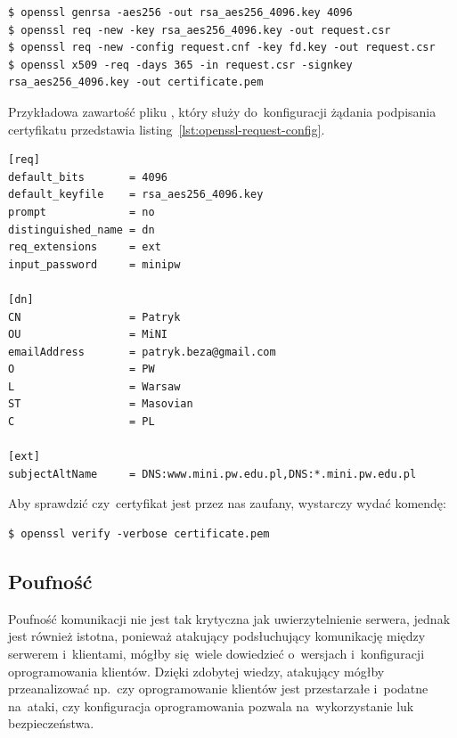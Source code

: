 \documentclass[thesis]{subfiles}
\begin{document}
\begin{lstlisting}[numbers=none,caption={Wygenerowanie i~podpisanie certyfikatu X.509},label=lst:openssl-gencert]
$ openssl genrsa -aes256 -out rsa_aes256_4096.key 4096
$ openssl req -new -key rsa_aes256_4096.key -out request.csr
$ openssl req -new -config request.cnf -key fd.key -out request.csr
$ openssl x509 -req -days 365 -in request.csr -signkey rsa_aes256_4096.key -out certificate.pem
\end{lstlisting}

Przykładowa zawartość pliku , który służy do~konfiguracji żądania podpisania certyfikatu przedstawia listing~\ref{lst:openssl-request-config}.

\begin{lstlisting}[numbers=none,caption={Plik z~konfiguracją certyfikatu X.509},label=lst:openssl-request-config]
[req]
default_bits       = 4096
default_keyfile    = rsa_aes256_4096.key
prompt             = no
distinguished_name = dn
req_extensions     = ext
input_password     = minipw

[dn]
CN                 = Patryk
OU                 = MiNI
emailAddress       = patryk.beza@gmail.com
O                  = PW
L                  = Warsaw
ST                 = Masovian
C                  = PL

[ext]
subjectAltName     = DNS:www.mini.pw.edu.pl,DNS:*.mini.pw.edu.pl
\end{lstlisting}

Aby sprawdzić czy~certyfikat jest przez nas zaufany, wystarczy wydać komendę:
\begin{lstlisting}[numbers=none]
$ openssl verify -verbose certificate.pem
\end{lstlisting}


\subsection{Poufność}

Poufność komunikacji nie jest tak krytyczna jak uwierzytelnienie serwera, jednak jest również istotna, ponieważ atakujący podsłuchujący komunikację między serwerem i~klientami, mógłby się~wiele dowiedzieć o~wersjach i~konfiguracji oprogramowania klientów. Dzięki zdobytej wiedzy, atakujący mógłby przeanalizować np.~czy oprogramowanie klientów jest przestarzałe i~podatne na~ataki, czy konfiguracja oprogramowania pozwala na~wykorzystanie luk bezpieczeństwa.
\end{document}
